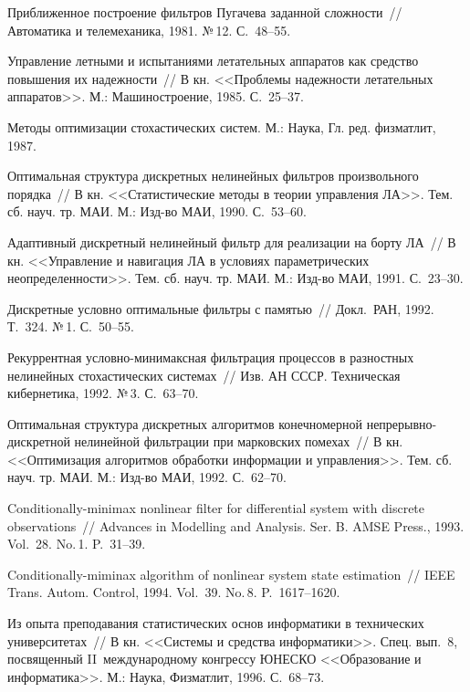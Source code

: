 \begin{multicols}{2}
{{\begin{thebibliography}{99}
Приближенное построение фильтров
Пугачева заданной сложности~// Автоматика и телемеханика,
1981. №\,12. С.~48--55.

Управление летными и испытаниями летательных
аппаратов как средство повышения их надежности~// В кн.
<<Проблемы надежности летательных аппаратов>>. М.: Машиностроение,
1985. С.~25--37.

 Методы оптимизации стохастических систем.  
М.: Наука, Гл. ред. физ\-мат\-лит, 1987.

  Оптимальная структура дискретных нелинейных
фильтров произвольного порядка~// В кн. <<Статистические методы в теории 
управления ЛА>>. Тем. сб. науч. тр. МАИ. М.: Изд-во МАИ, 1990. С.~53--60.

Адаптивный дискретный нелинейный фильтр для
реализации на борту ЛА~// В кн. <<Управление и навигация ЛА в
условиях па\-ра\-мет\-ри\-че\-ских неопределенности>>. Тем. сб. науч. тр.
МАИ. М.: Изд-во МАИ, 1991. С.~23--30.

Дискретные условно оптимальные фильтры с
памятью~// Докл.\ РАН, 1992. Т.~324. №\,1. С.~50--55.

Рекуррентная условно-минимаксная фильтрация
процессов в разностных нелинейных стохастических системах~//
Изв. АН СССР. Техническая кибернетика, 1992. №\,3. С.~63--70.

Оптимальная структура дискретных алгоритмов
конечномерной непрерывно-дискретной нелинейной фильтрации
при марковских помехах~// В кн. <<Оптимизация алгоритмов
обработки информации и управления>>. Тем. сб. науч. тр. МАИ. М.:
Изд-во МАИ, 1992. С.~62--70.

 Conditionally-minimax nonlinear filter for differential 
system with discrete observations~//  Advances in Modelling and Analysis. Ser. 
B. AMSE Press., 1993. Vol.~28.  No.\,1. P.~31--39.

 Conditionally-miminax algorithm of nonlinear 
system state estimation~// IEEE Trans. Autom. Control,  1994. Vol.~39. No.\,8. 
P.~1617--1620.

Из опыта преподавания статистических основ
информатики в технических университетах~// В кн. <<Системы и
средства информатики>>. Спец. вып.~8, посвященный
II~международному конгрессу ЮНЕСКО <<Образование и информатика>>. М.:
Наука, Физматлит, 1996. С.~68--73.


\end{thebibliography}}}
\end{multicols}
